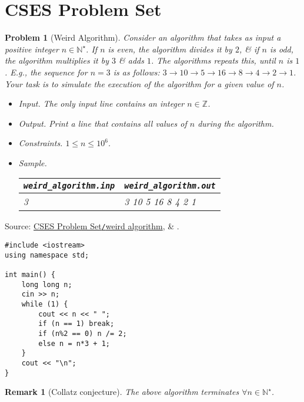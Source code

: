 \documentclass{article}
\newtheorem{problem}{Problem}
\newtheorem{remark}{Remark}
\begin{document}

\section{CSES Problem Set}

\begin{problem}[Weird Algorithm]
	Consider an algorithm that takes as input a positive integer $n\in\mathbb{N}^\star$. If $n$ is even, the algorithm divides it by $2$, \& if $n$ is odd, the algorithm multiplies it by $3$ \& adds $1$. The algorithms repeats this, until $n$ is $1$. E.g., the sequence for $n = 3$ is as follows: $3\to10\to5\to16\to8\to4\to2\to1$. Your task is to simulate the execution of the algorithm for a given value of $n$.
	\begin{itemize}
		\item {\sf Input.} The only input line contains an integer $n\in\mathbb{Z}$.
		\item {\sf Output.} Print a line that contains all values of $n$ during the algorithm.
		\item {\sf Constraints.} $1\le n\le10^6$.
		\item {\sf Sample.}
		\begin{table}[H]
			\centering
			\begin{tabular}{|l|l|}
				\hline
				\verb|weird_algorithm.inp| & \verb|weird_algorithm.out| \\
				\hline
				3 & 3 10 5 16 8 4 2 1 \\
				\hline
			\end{tabular}
		\end{table}
	\end{itemize}
\end{problem}
Source: \href{https://cses.fi/problemset/task/1068}{CSES Problem Set\texttt{/}weird algorithm}, \& \cite[Sect. 1.3, pp. 5--7]{Laaksonen2020}.

\begin{verbatim}
#include <iostream>
using namespace std;

int main() {
    long long n;
    cin >> n;
    while (1) {
        cout << n << " ";
        if (n == 1) break;
        if (n%2 == 0) n /= 2;
        else n = n*3 + 1;
    }
    cout << "\n";
}
\end{verbatim}

\begin{remark}[Collatz conjecture]
	The above algorithm terminates $\forall n\in\mathbb{N}^\star$.
\end{remark}
\end{document}
